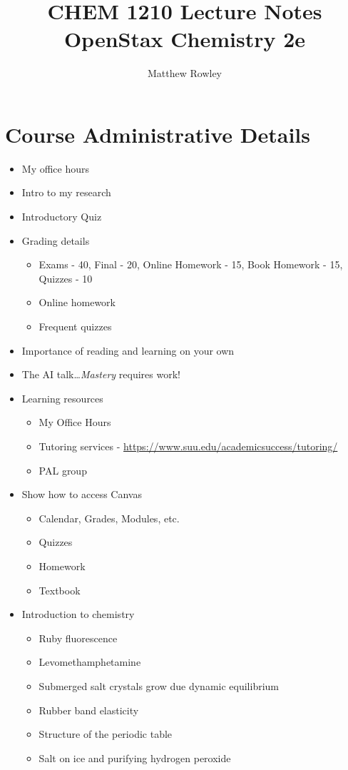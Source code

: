 \documentclass[12pt, openany, letterpaper]{memoir}
\begin{document}
\title{CHEM 1210 Lecture Notes\\ OpenStax Chemistry 2e}
\author{Matthew Rowley}
\mainmatter
\maketitle
\chapter*{Course Administrative Details}
\begin{itemize}
	\item My office hours
	\item Intro to my research
	\item Introductory Quiz
	\item Grading details
	      \begin{itemize}
		      \item Exams - 40, Final - 20, Online Homework - 15, Book Homework - 15, Quizzes - 10
		      \item Online homework
		      \item Frequent quizzes
	      \end{itemize}
	\item Importance of reading and learning on your own
  \item The AI talk\ldots \emph{Mastery} requires work!
	\item Learning resources
	      \begin{itemize}
		      \item My Office Hours
		      \item Tutoring services - \href{https://www.suu.edu/academicsuccess/tutoring/}{https://www.suu.edu/academicsuccess/tutoring/}
          \item PAL group
	      \end{itemize}
	\item Show how to access Canvas
	      \begin{itemize}
		      \item Calendar, Grades, Modules, etc.
		      \item Quizzes
          \item Homework
		      \item Textbook
	      \end{itemize}
	\item Introduction to chemistry
	      \begin{itemize}
		      \item Ruby fluorescence
		      \item Levomethamphetamine
          \item Submerged salt crystals grow due dynamic equilibrium
		      \item Rubber band elasticity
		      \item Structure of the periodic table
		      \item Salt on ice and purifying hydrogen peroxide
	      \end{itemize}
\end{itemize}
\end{document}
